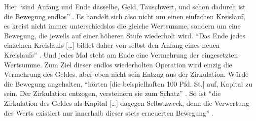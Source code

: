 \documentclass[12pt,
               DIV13,
               paper=a4,
               twoside=false,
               onehalfspacing,
               bibliography=totoc,
               toc=graduated,
               draft,
               ]{scrartcl}
\newcommand{\lips}{\dots\unkern}
\newcommand{\pc}[2]{\parencite[#1]{#2}}
\newcommand{\vgl}[2]{\parencite[vgl.][#1]{#2}}
\newcommand{\worries}[1]{\ifdraft{\textcolor{blue}{\texttt{(#1)}}}{}}
\begin{document}


Hier "`sind Anfang und Ende dasselbe, Geld, Tauschwert, und schon
dadurch ist die Bewegung endlos"' \pc{166}{kap}. Es handelt sich also
nicht um einen einfachen Kreislauf, es kreist nicht immer
unterschiedslos die gleiche Wertsumme, sondern um eine Bewegung, die
jeweils auf einer höheren Stufe wiederholt wird. "`Das Ende jedes
einzelnen Kreislaufs [\lips] bildet daher von selbst den Anfang eines
neuen Kreislaufs"' \pc{S. 166 f.}{kap}. Und jedes Mal steht am Ende
eine Vermehrung der eingesetzten Wertsumme. Zum Ziel dieser endlos
wiederholten Operation wird einzig die Vermehrung des Geldes, aber
eben nicht sein Entzug aus der Zirkulation. Würde die Bewegung
angehalten, "`hörten [die beispielhaften 100 Pfd. St.] auf, Kapital zu
sein. Der Zirkulation entzogen, versteinern sie zum Schatz"'
\pc{166}{kap}. So ist "`die Zirkulation des Geldes als Kapital [\lips]
dagegen Selbstzweck, denn die Verwertung des Werts existiert nur
innerhalb dieser stets erneuerten Bewegung"' \pc{167}{kap}.



\end{document}
